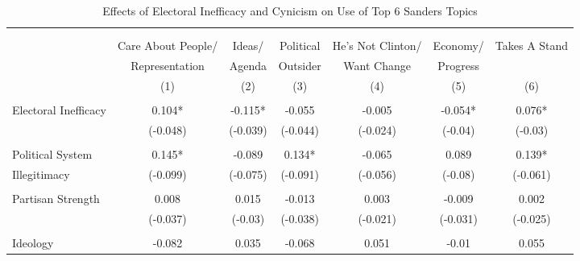 \documentclass[12pt]{article}
\begin{document}
\begin{appendices}
\begin{refsection}
\begin{table}[!ht] \centering 
  \caption{Effects of Electoral Inefficacy and Cynicism on Use of Top 6 Sanders Topics}\vspace*{-0.25cm}
  \label{tab:outsider-bernie} 
  \renewcommand{\arraystretch}{0.5}
      \begin{adjustbox}{width=\textwidth,center}
\begin{tabular}{@{\extracolsep{5pt}}lcccccc} 
\\[-1.3ex]
\hline\hline \\[-1.8ex] 
\\[-1ex] 
                     & Care About People/   & Ideas/  & Political & He's Not Clinton/ & Economy/ & Takes A Stand \\
                     & Representation       & Agenda  & Outsider  & Want Change       & Progress &               \\
                     & (1)        & (2)       & (3)          & (4)          & (5)              & (6)            \\ \hline \\
Electoral Inefficacy & 0.104*             & -0.115*  & -0.055    & -0.005            & -0.054*  & 0.076*        \\
                     & (-0.048)           & (-0.039) & (-0.044)  & (-0.024)          & (-0.04)  & (-0.03)       \\
                     &                    &          &           &                   &          &               \\
Political System     & 0.145*             & -0.089   & 0.134*    & -0.065            & 0.089    & 0.139*        \\
Illegitimacy         & (-0.099)           & (-0.075) & (-0.091)  & (-0.056)          & (-0.08)  & (-0.061)      \\
                     &                    &          &           &                   &          &               \\
Partisan Strength    & 0.008              & 0.015    & -0.013    & 0.003             & -0.009   & 0.002         \\
                     & (-0.037)           & (-0.03)  & (-0.038)  & (-0.021)          & (-0.031) & (-0.025)      \\
                     &                    &          &           &                   &          &               \\
Ideology             & -0.082             & 0.035    & -0.068    & 0.051             & -0.01    & 0.055         \\

\end{tabular}
\end{adjustbox}
\end{table}
\end{refsection}
\end{appendices}
\end{document}

